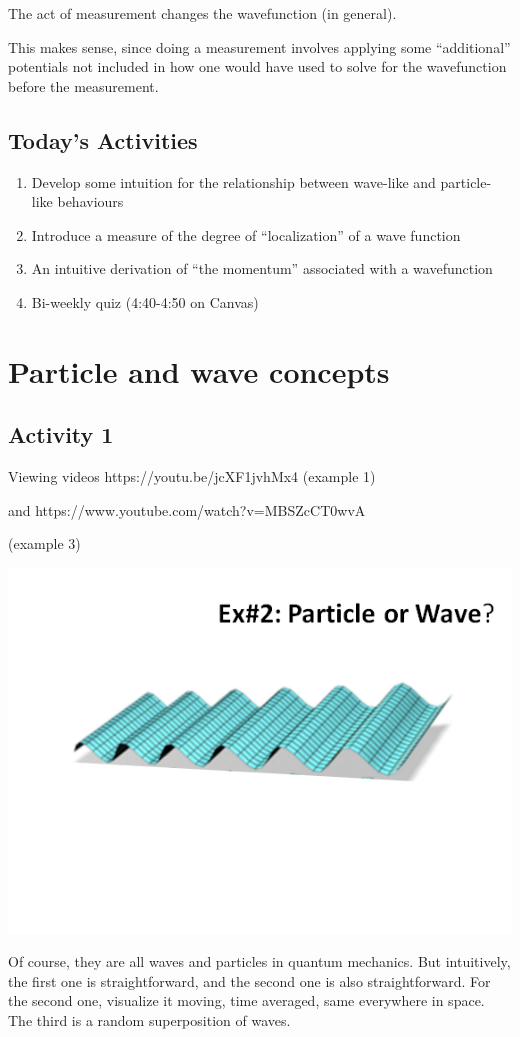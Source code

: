\documentclass{article}
\begin{document}
The act of measurement changes the wavefunction (in general).

This makes sense, since doing a measurement involves applying some “additional” potentials not included in how one would have used to solve for the wavefunction before the measurement.

\subsection*{Today's Activities}

\begin{enumerate}
    \item Develop some intuition for the relationship between wave-like and particle-like behaviours
    \item Introduce a measure of the degree of “localization” of a wave function
    \item An intuitive derivation of “the momentum” associated with a wavefunction
    \item Bi-weekly quiz (4:40-4:50 on Canvas)
\end{enumerate}

\section{Particle and wave concepts}

\subsection{Activity 1}

Viewing videos https://youtu.be/jcXF1jvhMx4 (example 1)

and https://www.youtube.com/watch?v=MBSZcCT0wvA

(example 3)

\includegraphics[width = 0.6 \textwidth]{Lecture03/1.png}

Of course, they are all waves and particles in quantum mechanics. But intuitively, the first one is straightforward, and the second one is also straightforward. For the second one, visualize it moving, time averaged, same everywhere in space. The third is a random superposition of waves. 
\end{document}
